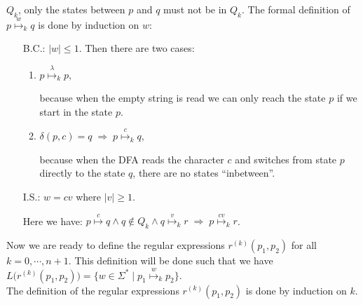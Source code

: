 $Q_k$, only the states between $p$ and $q$ must not be in $Q_k$.
The formal definition of $p \stackrel{w}{\mapsto}_k q$ is done by induction on  $w$:
\begin{enumerate}
\item[B.C.:] $|w| \leq 1$.  Then there are two cases:
  \begin{enumerate}
  \item $p \stackrel{\lambda}{\mapsto}_k p$,

        because when the empty string is read we can only reach the state $p$ if we start in the state $p$.
  \item $\delta(p, c) = q \;\Rightarrow\; p \stackrel{c}{\mapsto}_k q$,

        because when the \textsc{DFA} reads the character $c$ and switches from state $p$ directly
        to the state $q$, there are no states ``inbetween''.
  \end{enumerate}
\item[I.S.:] $w = cv$ where $|v| \geq 1$.

             Here we have:
             \hspace*{1.3cm}
            $p \stackrel{c}{\mapsto} q \wedge q \not\in Q_k \wedge q \stackrel{v}{\mapsto}_k r
              \;\Rightarrow\; p \stackrel{cv}{\mapsto}_k r$.
\end{enumerate}
Now we are ready to define the regular expressions $r^{(k)}(p_1, p_2)$ for all $k=0,\cdots,n+1$.
This definition will be done such that we have
\\[0.2cm]
\hspace*{1.3cm}
$L\bigl(r^{(k)}(p_1, p_2)\bigr) = \bigl\{ w \in \Sigma^* \mid p_1 \stackrel{w}{\mapsto}_k p_2 \bigr\}$.
\\[0.2cm]
The definition of the regular expressions $r^{(k)}(p_1, p_2)$ is done by induction on $k$.
